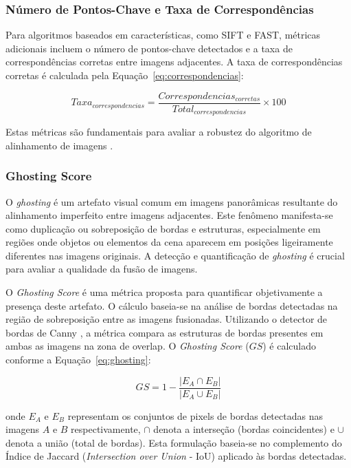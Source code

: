 \subsubsection{Número de Pontos-Chave e Taxa de Correspondências}

Para algoritmos baseados em características, como SIFT e FAST, métricas adicionais incluem o número de pontos-chave detectados e a taxa de correspondências corretas entre imagens adjacentes. A taxa de correspondências corretas é calculada pela Equação~\ref{eq:correspondencias}:

\begin{equation}
\label{eq:correspondencias}
Taxa_{correspondencias} = \frac{Correspondencias_{corretas}}{Total_{correspondencias}} \times 100
\end{equation}

Estas métricas são fundamentais para avaliar a robustez do algoritmo de alinhamento de imagens \cite{lowe2004distinctive}.

\subsubsection{Ghosting Score}

O \textit{ghosting} é um artefato visual comum em imagens panorâmicas resultante do alinhamento imperfeito entre imagens adjacentes. Este fenômeno manifesta-se como duplicação ou sobreposição de bordas e estruturas, especialmente em regiões onde objetos ou elementos da cena aparecem em posições ligeiramente diferentes nas imagens originais. A detecção e quantificação de \textit{ghosting} é crucial para avaliar a qualidade da fusão de imagens.

O \textit{Ghosting Score} é uma métrica proposta para quantificar objetivamente a presença deste artefato. O cálculo baseia-se na análise de bordas detectadas na região de sobreposição entre as imagens fusionadas. Utilizando o detector de bordas de Canny \cite{gonzalez2008digital}, a métrica compara as estruturas de bordas presentes em ambas as imagens na zona de overlap. O \textit{Ghosting Score} ($GS$) é calculado conforme a Equação~\ref{eq:ghosting}:

\begin{equation}
\label{eq:ghosting}
GS = 1 - \frac{|E_A \cap E_B|}{|E_A \cup E_B|}
\end{equation}

\noindent onde $E_A$ e $E_B$ representam os conjuntos de pixels de bordas detectadas nas imagens $A$ e $B$ respectivamente, $\cap$ denota a interseção (bordas coincidentes) e $\cup$ denota a união (total de bordas). Esta formulação baseia-se no complemento do Índice de Jaccard (\textit{Intersection over Union} - IoU) aplicado às bordas detectadas.

